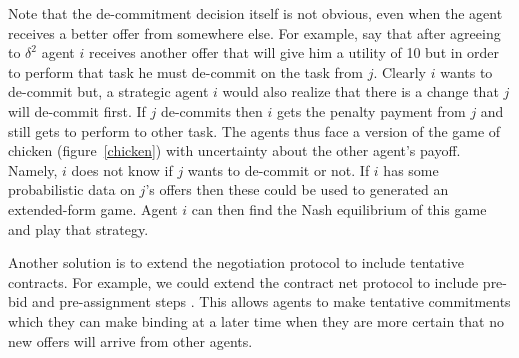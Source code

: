 Note that the de-commitment decision itself is not obvious, even when
the agent receives a better offer from somewhere else. For example,
say that after agreeing to $\delta^2$ agent $i$ receives another offer
that will give him a utility of 10 but in order to perform that task
he must de-commit on the task from $j$. Clearly $i$ wants to de-commit
but, a strategic agent $i$ would also realize that there is a change
that $j$ will de-commit first. If $j$ de-commits then $i$ gets the
penalty payment from $j$ and still gets to perform to other task. The
agents thus face a version of the game of chicken
(figure~\ref{chicken}) with uncertainty about the other agent's
payoff. Namely, $i$ does not know if $j$ wants to de-commit or not. If
$i$ has some probabilistic data on $j$'s offers then these could be
used to generated an extended-form game. Agent $i$ can then find the
Nash equilibrium of this game and play that strategy.

Another solution is to extend the negotiation protocol to include
tentative contracts. For example, we could extend the contract net
protocol to include pre-bid and pre-assignment steps \cite{aknine04a}.
This allows agents to make tentative commitments which they can make
binding at a later time when they are more certain that no new offers
will arrive from other agents.





